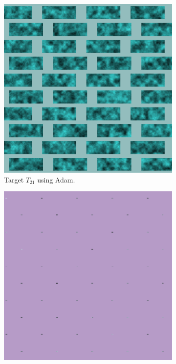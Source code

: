 \begin{figure}[hp]
\centering
\begin{subfigure}[t]{.25\textwidth}
    \centering
    \includegraphics[width=\linewidth]{img/evaluation/M2/2param/MSE_Adam_final_render.png}
    \caption{Target $T_{21}$ using Adam.}
    \label{fig:M2MSEFinalRenders2paramAdam}
\end{subfigure}\hspace{0.7cm}
\begin{subfigure}[t]{.25\textwidth}
    \centering
    \includegraphics[width=\linewidth]{img/evaluation/M2/random/MSE_Adam_random_final_render.png}

\end{subfigure}
\end{figure}
